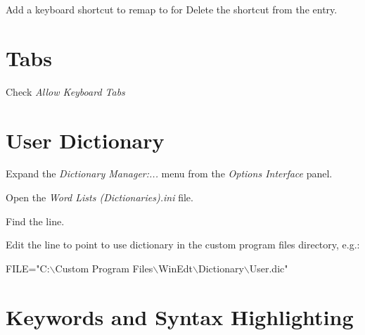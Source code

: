 \documentclass{lebook}
\newcommand{\tbs}{$\backslash$}
\begin{document}
Add a keyboard shortcut to remap  to  for 
Delete the  shortcut from the  entry.

\section{Tabs}
   \begin{numberedlist}
   	\item {}
   	\item Check \textit{Allow Keyboard Tabs}
   \end{numberedlist}

\section{User Dictionary}
\begin{numberedlist}
	\item Expand the \textit{Dictionary Manager:...} menu from the \textit{Options Interface} panel.
	\item Open the \textit{Word Lists (Dictionaries).ini} file.
	\item Find the  line.
	\item Edit the  line to point to use dictionary in the custom program files directory, e.g.:
	\begin{plainlist}
		\item FILE="C:\tbs{}Custom Program Files\tbs{}WinEdt\tbs{}Dictionary\tbs{}User.dic"
	\end{plainlist}
\end{numberedlist}

\section{Keywords and Syntax Highlighting}
\end{document}
